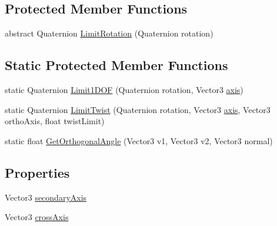\subsection*{Protected Member Functions}
\begin{DoxyCompactItemize}
\item 
abstract Quaternion \mbox{\hyperlink{class_root_motion_1_1_final_i_k_1_1_rotation_limit_aebdcf7af948a0205901d2b839a76b985}{Limit\+Rotation}} (Quaternion rotation)
\end{DoxyCompactItemize}
\subsection*{Static Protected Member Functions}
\begin{DoxyCompactItemize}
\item 
static Quaternion \mbox{\hyperlink{class_root_motion_1_1_final_i_k_1_1_rotation_limit_ab65c3252e14fb6c74173ad2061b4f1d4}{Limit1\+D\+OF}} (Quaternion rotation, Vector3 \mbox{\hyperlink{class_root_motion_1_1_final_i_k_1_1_rotation_limit_a93c11beb22e4e50550bd32284fb8c38b}{axis}})
\item 
static Quaternion \mbox{\hyperlink{class_root_motion_1_1_final_i_k_1_1_rotation_limit_a6eb7d443630c5d74bd4789723d96c396}{Limit\+Twist}} (Quaternion rotation, Vector3 \mbox{\hyperlink{class_root_motion_1_1_final_i_k_1_1_rotation_limit_a93c11beb22e4e50550bd32284fb8c38b}{axis}}, Vector3 ortho\+Axis, float twist\+Limit)
\item 
static float \mbox{\hyperlink{class_root_motion_1_1_final_i_k_1_1_rotation_limit_ac30eb4d472a7d7cd9910b0c72a1a4fd1}{Get\+Orthogonal\+Angle}} (Vector3 v1, Vector3 v2, Vector3 normal)
\end{DoxyCompactItemize}
\subsection*{Properties}
\begin{DoxyCompactItemize}
\item 
Vector3 \mbox{\hyperlink{class_root_motion_1_1_final_i_k_1_1_rotation_limit_adcbc30204a57dd0d982ca186b3ee21ec}{secondary\+Axis}}
\item 
Vector3 \mbox{\hyperlink{class_root_motion_1_1_final_i_k_1_1_rotation_limit_a8c7e4a08c2962b606d5c871f04b6023b}{cross\+Axis}}
\end{DoxyCompactItemize}


